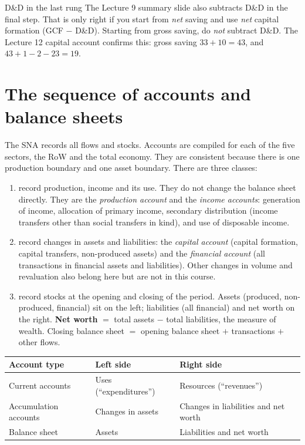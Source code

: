 \begin{trap}{D\&D in the last rung}
\small The Lecture 9 summary slide also subtracts D\&D in the final step. That is only right if
you start from \emph{net} saving and use \emph{net} capital formation (GCF $-$ D\&D). Starting
from gross saving, do \emph{not} subtract D\&D. The Lecture 12 capital account confirms this:
gross saving $33+10=43$, and $43+1-2-23=19$.
\end{trap}

\section{The sequence of accounts and balance sheets}\label{sec:seq}

The SNA records all flows and stocks. Accounts are compiled for each of the five sectors, the RoW
and the total economy. They are consistent because there is one production boundary and one asset
boundary. There are three classes:
\begin{enumerate}
\item {} record production, income and its use. They do not change the balance
  sheet directly. They are the \emph{production account} and the \emph{income accounts}:
  generation of income, allocation of primary income, secondary distribution (income transfers
  other than social transfers in kind), and use of disposable income.
\item {} record changes in assets and liabilities: the \emph{capital
  account} (capital formation, capital transfers, non-produced assets) and the \emph{financial
  account} (all transactions in financial assets and liabilities). Other changes in volume and
  revaluation also belong here but are not in this course.
\item {} record stocks at the opening and closing of the period. Assets
  (produced, non-produced, financial) sit on the left; liabilities (all financial) and net worth
  on the right. \textbf{Net worth} $=$ total assets $-$ total liabilities, the measure of wealth.
  Closing balance sheet $=$ opening balance sheet $+$ transactions $+$ other flows.
\end{enumerate}

\begin{center}\small
\begin{tabular}{@{}lll@{}}
\toprule
\textbf{Account type} & \textbf{Left side} & \textbf{Right side} \\
\midrule
Current accounts & Uses (``expenditures'') & Resources (``revenues'') \\
Accumulation accounts & Changes in assets & Changes in liabilities and net worth \\
Balance sheet & Assets & Liabilities and net worth \\
\bottomrule
\end{tabular}
\end{center}

